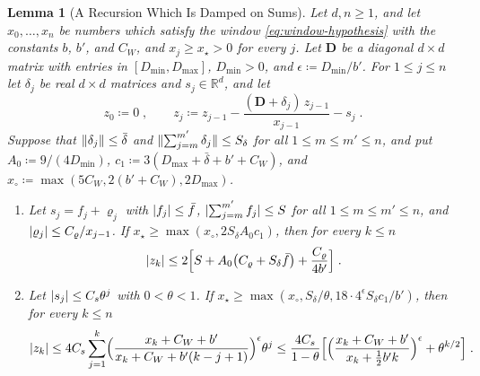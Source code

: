 \documentclass[11pt]{preprint}
\DeclarePairedDelimiter{\abs}{\lvert}{\rvert}
\DeclarePairedDelimiter{\norm}{\lVert}{\rVert}
\numberwithin{equation}{section}
\newtheorem{lemma}[theorem]{Lemma}
\theoremstyle{definition}
\theoremstyle{remark}
\theoremstyle{plain}
\begin{document}
\begin{lemma}[A Recursion Which Is Damped on Sums]\label{lem:damped-sums}
Let $d, n \geq 1$, and let $x_0, \dots, x_n$ be numbers which satisfy the window \eqref{eq:window-hypothesis} with the constants $b$, $b'$, and $C_W$, and $x_j \geq x_\star > 0$ for every $j$. Let $\mathbf D$ be a diagonal $d \times d$ matrix with entries in $[D_{\min}, D_{\max}]$, $D_{\min} > 0$, and $\epsilon \coloneqq D_{\min}/b'$. For $1 \leq j \leq n$ let $\delta_j$ be real $d \times d$ matrices and $s_j \in \mathbb R^d$, and let
\begin{equation}\label{eq:damped-sums-recursion}
    z_0 \coloneqq 0\;,
    \qquad
    z_j \coloneqq z_{j-1} - \frac{(\mathbf D + \delta_j)\,z_{j-1}}{x_{j-1}} - s_j\;.
\end{equation}
Suppose that $\norm{\delta_j} \leq \bar\delta$ and $\norm{\sum_{j=m}^{m'}\delta_j} \leq S_\delta$ for all $1 \leq m \leq m' \leq n$, and put $A_0 \coloneqq 9/(4D_{\min})$, $c_1 \coloneqq 3(D_{\max} + \bar\delta + b' + C_W)$, and $x_\circ \coloneqq \max(5C_W, 2(b' + C_W), 2D_{\max})$.
\begin{enumerate}[label=(\alph*)]
\item Let $s_j = f_j + \varrho_j$ with $\abs{f_j} \leq \bar f$, $\abs{\sum_{j=m}^{m'}f_j} \leq S$ for all $1 \leq m \leq m' \leq n$, and $\abs{\varrho_j} \leq C_\varrho/x_{j-1}$. If $x_\star \geq \max(x_\circ, 2S_\delta A_0c_1)$, then for every $k \leq n$
\begin{equation}\label{eq:damped-sums-bound}
    \abs{z_k} \leq 2\Bigl[S + A_0\bigl(C_\varrho + S_\delta\bar f\bigr) + \frac{C_\varrho}{4b'}\Bigr]\;.
\end{equation}
\item Let $\abs{s_j} \leq C_s\theta^j$ with $0 < \theta < 1$. If $x_\star \geq \max(x_\circ, S_\delta/\theta, 18 \cdot 4^\epsilon S_\delta c_1/b')$, then for every $k \leq n$
\begin{equation}\label{eq:damped-sums-decay}
    \abs{z_k} \leq 4C_s\sum_{j=1}^{k}\Bigl(\frac{x_k + C_W + b'}{x_k + C_W + b'(k - j + 1)}\Bigr)^{\epsilon}\theta^j \leq \frac{4C_s}{1 - \theta}\Bigl[\Bigl(\frac{x_k + C_W + b'}{x_k + \frac12b'k}\Bigr)^{\epsilon} + \theta^{k/2}\Bigr]\;.
\end{equation}
\end{enumerate}
\end{lemma}
\end{document}
